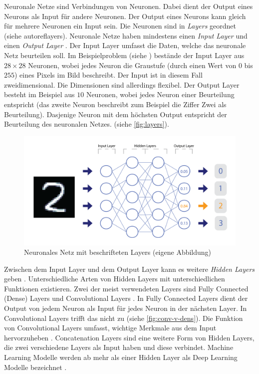Neuronale Netze sind Verbindungen von Neuronen. Dabei dient der Output eines
Neurons als Input für andere Neuronen. Der Output eines Neurons kann gleich
für mehrere Neuronen ein Input sein. Die Neuronen sind in \emph{Layers} geordnet
(siehe autoref{layers}). Neuronale Netze haben mindestens einen \emph{Input
Layer} und einen \emph{Output Layer}
\cite{nielsen_neural_2015}\cite{ognjanovski_everything_2020}. Der Input Layer
umfasst die Daten, welche das neuronale Netz beurteilen soll. Im
Beispielproblem (siehe ) bestände der Input Layer aus
$28\times28$ Neuronen, wobei jedes Neuron die Graustufe (durch einen Wert von
$0$ bis $255$) eines Pixels im Bild beschreibt. Der Input ist in diesem Fall
zweidimensional. Die Dimensionen sind allerdings flexibel. Der Output Layer
besteht im Beispiel aus $10$ Neuronen, wobei jedes Neuron einer Beurteilung
entspricht (das zweite Neuron beschreibt zum Beispiel die Ziffer Zwei als
Beurteilung). Dasjenige Neuron mit dem höchsten Output entspricht der
Beurteilung des neuronalen Netzes. (siehe \autoref{fig:layers}).
 
\begin{figure}[!ht]
   \centering
   \includegraphics[width=\textwidth]{images/theorie/layers.png}
   \caption{Neuronales Netz mit beschrifteten Layers (eigene Abbildung)}\label{fig:layers}
\end{figure}
 
Zwischen dem Input Layer und dem Output Layer kann es weitere \emph{Hidden
Layers} geben \cite{malik_what_2019}. Unterschiedliche Arten von Hidden Layers
mit unterschiedlichen Funktionen existieren. Zwei der meist verwendeten Layers
sind Fully Connected (Dense) Layers und Convolutional Layers
\cite{unzueta_convolutional_2022}. In Fully Connected Layers dient der Output
von jedem Neuron als Input für jedes Neuron in der nächsten Layer. In
Convolutional Layers trifft das nicht zu (siehe \autoref{fig:conv-v-dens}). Die
Funktion von Convolutional Layers umfasst, wichtige Merkmale aus dem Input
hervorzuheben \cite{deshpande_beginners_nodate}. Concatenation Layers
\cite{jayawardana_concatenating_2021} sind eine weitere Form von Hidden Layers,
die zwei verschiedene Layers als Input haben und diese verbindet. Machine
Learning Modelle werden ab mehr als einer Hidden Layer als Deep Learning Modelle
bezeichnet \cite{jan-dirk_kranz_deep_2019}.
 
